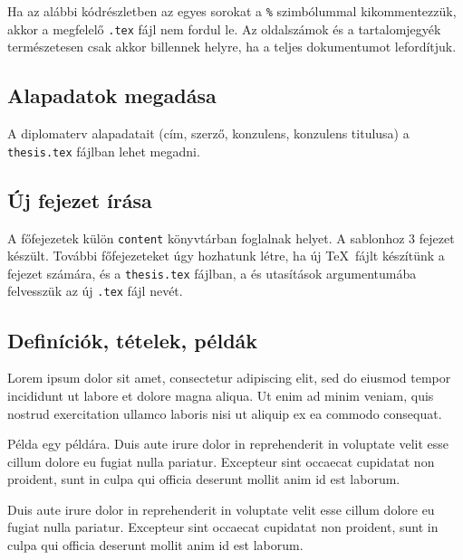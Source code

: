 Ha az alábbi kódrészletben az egyes sorokat a \verb+%+ szimbólummal kikommentezzük, akkor a megfelelő \verb+.tex+ fájl nem fordul le. Az oldalszámok és a tartalomjegyék természetesen csak akkor billennek helyre, ha a teljes dokumentumot lefordítjuk.

\newpage
\subsection{Alapadatok megadása}
A diplomaterv alapadatait (cím, szerző, konzulens, konzulens titulusa) a \verb+thesis.tex+ fájlban lehet megadni.

\subsection{Új fejezet írása}
A főfejezetek külön \verb+content+ könyvtárban foglalnak helyet. A sablonhoz 3 fejezet készült. További főfejezeteket úgy hozhatunk létre, ha új \TeX~fájlt készítünk a fejezet számára, és a \verb+thesis.tex+ fájlban, a \verb++ és \verb++ utasítások argumentumába felvesszük az új \verb+.tex+ fájl nevét.


\subsection{Definíciók, tételek, példák}

\begin{definition}
Lorem ipsum dolor sit amet, consectetur adipiscing elit, sed do eiusmod tempor incididunt ut labore et dolore magna aliqua. Ut enim ad minim veniam, quis nostrud exercitation ullamco laboris nisi ut aliquip ex ea commodo consequat.
\end{definition}

\begin{example}
Példa egy példára. Duis aute irure dolor in reprehenderit in voluptate velit esse cillum dolore eu fugiat nulla pariatur. Excepteur sint occaecat cupidatat non proident, sunt in culpa qui officia deserunt mollit anim id est laborum.
\end{example}

\begin{theorem}
Duis aute irure dolor in reprehenderit in voluptate velit esse cillum dolore eu fugiat nulla pariatur. Excepteur sint occaecat cupidatat non proident, sunt in culpa qui officia deserunt mollit anim id est laborum.
\end{theorem}
